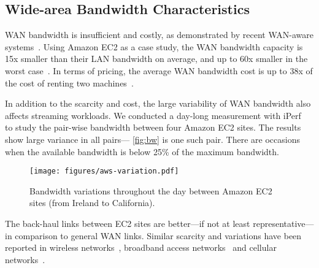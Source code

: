 

\subsection{Wide-area Bandwidth Characteristics}
\label{sec:wide-area-bandwidth}

WAN bandwidth is insufficient and costly, as demonstrated by recent WAN-aware
systems~\cite{hsieh17gaia, pu2015low, vulimiri2015wananlytics,
  vulimiri2015global}. Using Amazon EC2 as a case study, the WAN bandwidth
capacity is 15x smaller than their LAN bandwidth on average, and up to 60x
smaller in the worst case~\cite{hsieh17gaia}. In terms of pricing, the average
WAN bandwidth cost is up to 38x of the cost of renting two
machines~\cite{amazon2017pricing, hsieh17gaia}.

In addition to the scarcity and cost, the large variability of WAN bandwidth
also affects streaming workloads. We conducted a day-long measurement with
iPerf~\cite{iperf3} to study the pair-wise bandwidth between four Amazon EC2
sites.  The results show large variance in all pairs---
\autoref{fig:bw} is one
such pair.  There are occasions when
the available bandwidth is below 25\% of the
maximum bandwidth.

\begin{figure}
  \centering
  \texttt{[image: figures/aws-variation.pdf]}
  \caption{Bandwidth variations throughout the day between Amazon EC2 sites
    (from Ireland to California).}
  \label{fig:bw}
\end{figure}

The back-haul links between EC2 sites are better---if not at least
representative---in comparison to general WAN links. Similar scarcity and
variations have been reported in wireless networks~\cite{biswas2015large},
broadband access networks~\cite{grover2013peeking, sundaresan2014bismark} and
cellular networks~\cite{nikravesh2014mobile}. 

